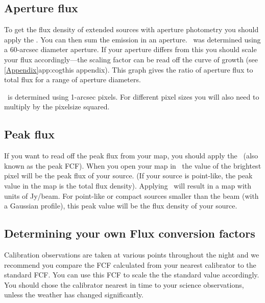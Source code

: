 \subsection{Aperture flux}

To get the flux density of extended sources with aperture photometry
you should apply the \fcfa.  You can then sum the emission in an
aperture. \fcfa\ was determined using a 60-arcsec diameter
aperture. If your aperture differs from this you should scale your
flux accordingly---the scaling factor can be read off the curve of
growth (see \cref{Appendix}{app:cog}{this appendix}). This graph gives
the ratio of aperture flux to total flux for a range of aperture
diameters.

\fcfa\ is determined using 1-arcsec pixels. For different pixel sizes
you will also need to multiply by the pixelsize squared.

\subsection{Peak flux}

If you want to read off the peak flux from your map, you should apply
the \fcfb\ (also known as the peak FCF).  When you open your map in
\gaia\ the value of the brightest pixel will be the peak flux of your
source. (If your source is point-like, the peak value in the map is
the total flux density). Applying \fcfb\ will result in a map with
units of Jy/beam. For point-like or compact sources smaller than the
beam (with a Gaussian profile), this peak value will be the flux
density of your source.

\subsection{Determining your own Flux conversion factors}
\label{sec:own_fcf}

Calibration observations are taken at various points throughout the
night and we recommend you compare the FCF calculated from your
nearest calibrator to the standard FCF. You can use this FCF to scale
the the standard value accordingly. You should chose the calibrator
nearest in time to your science observations, unless the weather has
changed significantly.


